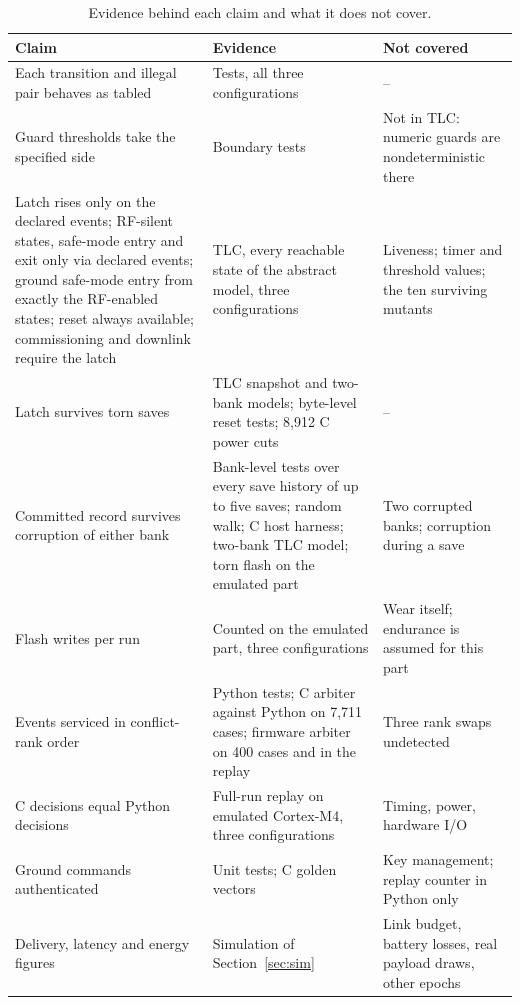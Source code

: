 \documentclass[preprint,12pt]{elsarticle}
\begin{document}
\begin{table}[t]
\centering
\scriptsize
\caption{Evidence behind each claim and what it does not cover.}
\label{tab:scope}
\begin{tabular}{@{}p{}p{}p{}@{}}
\toprule
Claim & Evidence & Not covered \\
\midrule
Each transition and illegal pair behaves as tabled & Tests, all three configurations & -- \\
Guard thresholds take the specified side & Boundary tests & Not in TLC: numeric guards are nondeterministic there \\
Latch rises only on the declared events; RF-silent states, safe-mode entry and exit only via declared events; ground safe-mode entry from exactly the RF-enabled states; reset always available; commissioning and downlink require the latch & TLC, every reachable state of the abstract model, three configurations & Liveness; timer and threshold values; the ten surviving mutants \\
Latch survives torn saves & TLC snapshot and two-bank models; byte-level reset tests; 8,912 C power cuts & -- \\
Committed record survives corruption of either bank & Bank-level tests over every save history of up to five saves; random walk; C host harness; two-bank TLC model; torn flash on the emulated part & Two corrupted banks; corruption during a save \\
Flash writes per run & Counted on the emulated part, three configurations & Wear itself; endurance is assumed for this part \\
Events serviced in conflict-rank order & Python tests; C arbiter against Python on 7,711 cases; firmware arbiter on 400 cases and in the replay & Three rank swaps undetected \\
C decisions equal Python decisions & Full-run replay on emulated Cortex-M4, three configurations & Timing, power, hardware I/O \\
Ground commands authenticated & Unit tests; C golden vectors & Key management; replay counter in Python only \\
Delivery, latency and energy figures & Simulation of Section~\ref{sec:sim} & Link budget, battery losses, real payload draws, other epochs \\
\bottomrule
\end{tabular}
\end{table}

\end{document}
